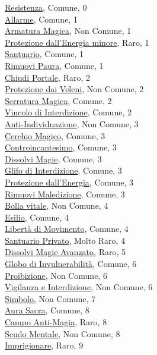 \begin{multicols}{3}
{{\hyperlink{Resistenza}{Resistenza}, Comune, 0\\
\hyperlink{Allarme}{Allarme}, Comune, 1\\
\hyperlink{Armatura Magica}{Armatura Magica}, Non Comune, 1\\
\hyperlink{Protezione dall'Energia minore}{Protezione dall'Energia minore}, Raro, 1\\
\hyperlink{Santuario}{Santuario}, Comune, 1\\
\hyperlink{Rimuovi Paura}{Rimuovi Paura}, Comune, 1\\
\hyperlink{Chiudi Portale}{Chiudi Portale}, Raro, 2\\
\hyperlink{Protezione dai Veleni}{Protezione dai Veleni}, Non Comune, 2\\
\hyperlink{Serratura Magica}{Serratura Magica}, Comune, 2\\
\hyperlink{Vincolo di Interdizione}{Vincolo di Interdizione}, Comune, 2\\
\hyperlink{Anti-Individuazione}{Anti-Individuazione}, Non Comune, 3\\
\hyperlink{Cerchio Magico}{Cerchio Magico}, Comune, 3\\
\hyperlink{Controincantesimo}{Controincantesimo}, Comune, 3\\
\hyperlink{Dissolvi Magie}{Dissolvi Magie}, Comune, 3\\
\hyperlink{Glifo di Interdizione}{Glifo di Interdizione}, Comune, 3\\
\hyperlink{Protezione dall'Energia}{Protezione dall'Energia}, Comune, 3\\
\hyperlink{Rimuovi Maledizione}{Rimuovi Maledizione}, Comune, 3\\
\hyperlink{Bolla vitale}{Bolla vitale}, Non Comune, 4\\
\hyperlink{Esilio}{Esilio}, Comune, 4\\
\hyperlink{Libertà di Movimento}{Libertà di Movimento}, Comune, 4\\
\hyperlink{Santuario Privato}{Santuario Privato}, Molto Raro, 4\\
\hyperlink{Dissolvi Magie Avanzato}{Dissolvi Magie Avanzato}, Raro, 5\\
\hyperlink{Globo di Invulnerabilità}{Globo di Invulnerabilità}, Comune, 6\\
\hyperlink{Proibizione}{Proibizione}, Non Comune, 6\\
\hyperlink{Vigilanza e Interdizione}{Vigilanza e Interdizione}, Non Comune, 6\\
\hyperlink{Simbolo}{Simbolo}, Non Comune, 7\\
\hyperlink{Aura Sacra}{Aura Sacra}, Comune, 8\\
\hyperlink{Campo Anti-Magia}{Campo Anti-Magia}, Raro, 8\\
\hyperlink{Scudo Mentale}{Scudo Mentale}, Non Comune, 8\\
\hyperlink{Imprigionare}{Imprigionare}, Raro, 9

}}
\end{multicols}
